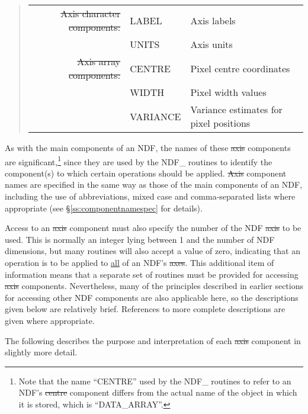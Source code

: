 \small
\begin{quote}
\begin{center}
\begin{tabular}{rl@{ --- }l}
\st{Axis character components:} & LABEL & Axis labels \\
                                 & UNITS & Axis units \\[1.5ex]
    \st{Axis array components:} & CENTRE & Pixel centre coordinates \\
                                 & WIDTH  & Pixel width values \\
                                 & VARIANCE & Variance estimates for pixel
                                              positions
\end{tabular}
\end{center}
\end{quote}
\normalsize

As with the main components of an NDF, the names of these \st{axis\/}
components are significant,\footnote{Note that the name ``CENTRE'' used by
the NDF\_ routines to refer to an NDF's \st{centre\/} component differs
from the actual name of the  object in which it is stored, which is
``DATA\_ARRAY''.} since they are used by the NDF\_ routines to identify the
component(s) to which certain operations should be applied. 
\st{Axis\/} component names are specified in the same way as those of the
main components of an NDF, including the use of abbreviations, mixed case
and comma-separated lists where appropriate (see
\S\ref{ss:componentnamespec} for details). 

Access to an \st{axis\/} component must also specify the number of the NDF
\st{axis} to be used.
This is normally an integer lying between 1 and the number of NDF
dimensions, but many routines will also accept a value of zero, indicating
that an operation is to be applied to \underline{all} of an NDF's \st{axes}. 
This additional item of information means that a separate set of routines
must be provided for accessing \st{axis\/} components. 
Nevertheless, many of the principles described in earlier sections for
accessing other NDF components are also applicable here, so the descriptions
given below are relatively brief.
References to more complete descriptions are given where appropriate. 

The following describes the purpose and interpretation of each \st{axis\/}
component in slightly more detail. 

